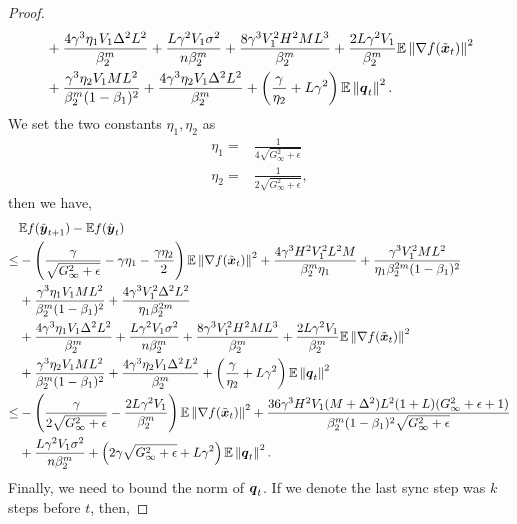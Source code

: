 \begin{proof}
\begin{align*}
    & + \frac{4\gamma^3\eta_1V_1\Delta^2L^2}{\beta_2^m} + \frac{L\gamma^2V_1\sigma^2}{n\beta_2^m} + \frac{8\gamma^3V_1^2H^2ML^3}{\beta_2^m} + \frac{2L\gamma^2V_1}{\beta_2^m}\mathbb E\left\| \nabla f(\tilde{\boldsymbol{x}}_t)\right\|^2 \\
    & + \frac{\gamma^3\eta_2V_1ML^2}{\beta_2^m(1-\beta_1)^2} + \frac{4\gamma^3\eta_2V_1\Delta^2L^2}{\beta_2^m} + \left( \frac{\gamma}{\eta_2} + L\gamma^2 \right)\mathbb{E}\left\| \boldsymbol{q}_t\right\|^2.
\end{align*}
We set the two constants $\eta_1,\eta_2$ as
\begin{align*}
    \eta_1 = & \frac{1}{4\sqrt{G_\infty^2+\epsilon}} \\
    \eta_2 = & \frac{1}{2\sqrt{G_\infty^2+\epsilon}},
\end{align*}
then we have,
\begin{align*}
    & \mathbb E f(\tilde{\boldsymbol{y}}_{t+1}) - \mathbb Ef(\tilde{\boldsymbol{y}}_{t}) \\
\leq & -\left( \frac{\gamma}{\sqrt{G_\infty^2+\epsilon}} - \gamma\eta_1 - \frac{\gamma\eta_2}{2} \right)\mathbb E\left\| \nabla f(\tilde{\boldsymbol{x}}_t) \right\|^2
    + \frac{4\gamma^3H^2V_1^2L^2M}{\beta_2^m\eta_1} + \frac{\gamma^3V_1^2ML^2}{\eta_1\beta_2^{2m}(1-\beta_1)^2} \\
    & + \frac{\gamma^3\eta_1V_1ML^2}{\beta_2^m(1-\beta_1)^2} + \frac{4\gamma^3V_1^2\Delta^2L^2}{\eta_1\beta_2^{2m}}\\
    & + \frac{4\gamma^3\eta_1V_1\Delta^2L^2}{\beta_2^m} + \frac{L\gamma^2V_1\sigma^2}{n\beta_2^m} + \frac{8\gamma^3V_1^2H^2ML^3}{\beta_2^m} + \frac{2L\gamma^2V_1}{\beta_2^m}\mathbb E\left\| \nabla f(\tilde{\boldsymbol{x}}_t)\right\|^2 \\
    & + \frac{\gamma^3\eta_2V_1ML^2}{\beta_2^m(1-\beta_1)^2} + \frac{4\gamma^3\eta_2V_1\Delta^2L^2}{\beta_2^m} + \left( \frac{\gamma}{\eta_2} + L\gamma^2 \right)\mathbb{E}\left\| \boldsymbol{q}_t\right\|^2 \\
\leq & - \left( \frac{\gamma}{2\sqrt{G_\infty^2+\epsilon}} - \frac{2L\gamma^2V_1}{\beta_2^m} \right)\mathbb E\left\| \nabla f(\tilde{\boldsymbol{x}}_t) \right\|^2
    + \frac{36\gamma^3H^2V_1(M+\Delta^2)L^2(1+L)(G_\infty^2+\epsilon+1)}{\beta_2^m(1-\beta_1)^2\sqrt{G_\infty^2+\epsilon}} \\
& + \frac{L\gamma^2V_1\sigma^2}{n\beta_2^m} + \left( 2\gamma\sqrt{G_\infty^2+\epsilon} + L\gamma^2 \right)\mathbb{E}\left\| \boldsymbol{q}_t\right\|^2.
\end{align*}
Finally, we need to bound the norm of $\boldsymbol{q}_t$.
If we denote the last sync step was $k$ steps before $t$, then,

\end{proof}
